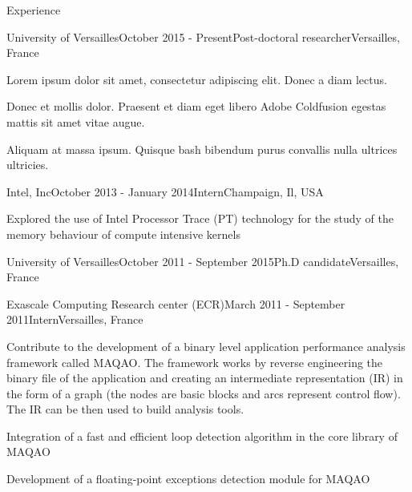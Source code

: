 \documentclass{resume} %
\begin{document}

\begin{rSection}{Experience}

\begin{rSubsection}{University of Versailles}{October 2015 - Present}{Post-doctoral researcher}{Versailles, France}
\item Lorem ipsum dolor sit amet, consectetur adipiscing elit. Donec a diam lectus.
\item Donec et mollis dolor. Praesent et diam eget libero Adobe Coldfusion egestas mattis sit amet vitae augue.
\item Aliquam at massa ipsum. Quisque bash bibendum purus convallis nulla ultrices ultricies.
\end{rSubsection}


\begin{rSubsection}{Intel, Inc}{October 2013 - January 2014}{Intern}{Champaign, Il, USA}
\item Explored the use of Intel Processor Trace (PT) technology for the study of the memory behaviour of compute intensive kernels
\end{rSubsection}


\begin{rSubsection}{University of Versailles}{October 2011 - September 2015}{Ph.D candidate}{Versailles, France}
\item           
\item 
\item 
\end{rSubsection}


\begin{rSubsection}{Exascale Computing Research center (ECR)}{March 2011 - September 2011}{Intern}{Versailles, France}
\item Contribute to the development of a binary level application performance analysis framework called MAQAO. The framework
      works by reverse engineering the binary file of the application and creating an intermediate representation (IR) in the 
      form of a graph (the nodes are basic blocks and arcs represent control flow). The IR can be then used to build 
      analysis tools.  
\item Integration of a fast and efficient loop detection algorithm in the core library of MAQAO  
\item Development of a floating-point exceptions detection module for MAQAO
\end{rSubsection}



\end{rSection}
\end{document}
